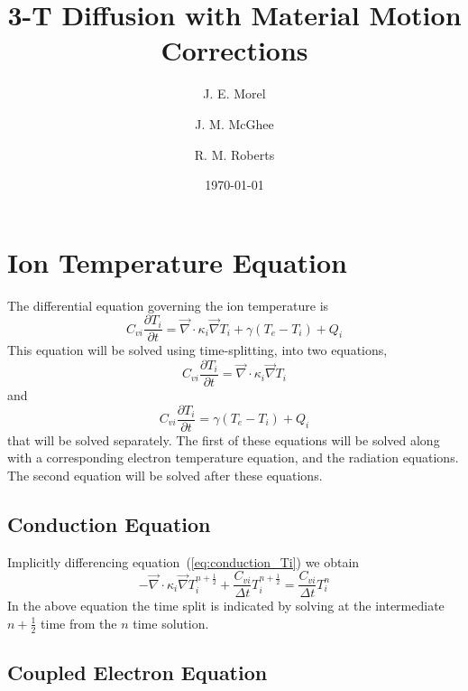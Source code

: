 \documentclass{article}
\newcommand{\partl}[2]{\ensuremath{\frac{\partial{#1}}{\partial{#2}}}}\newcommand{\del}{\ensuremath{\vec{\nabla}}}
\begin{document}
\title{3-T Diffusion with Material Motion Corrections}
\author{J. E. Morel \and J. M. McGhee \and R. M. Roberts}
\date{\today}

\maketitle

\newpage

\section{Ion Temperature Equation}

The differential equation governing the ion temperature is
\begin{equation}
        C_{vi} \partl{T_{i}}{t} = \del \cdot \kappa_{i} \del T_{i}
                                        + \gamma (T_{e}-T_{i}) + Q_{i}
\end{equation}
This equation will be solved using time-splitting, into two equations,
\begin{equation}
        C_{vi} \partl{T_{i}}{t} = \del \cdot \kappa_{i} \del T_{i}
\label{eq:conduction_Ti}
\end{equation}
and
\begin{equation}
        C_{vi} \partl{T_{i}}{t} = \gamma (T_{e}-T_{i}) + Q_{i}
\label{eq:couple_Ti}
\end{equation}
that will be solved separately.
The first of these equations will be solved along with a corresponding
electron temperature equation, and the radiation equations.
The second equation will be solved after these equations.

\subsection{Conduction Equation}

Implicitly differencing equation~(\ref{eq:conduction_Ti})
we obtain
\begin{equation}
  \boxed{
     - \del \cdot \kappa_{i} \del T_{i}^{n+\frac{1}{2}}
     + \frac{C_{vi}}{\Delta t} T_{i}^{n+\frac{1}{2}}
           = \frac{C_{vi}}{\Delta t} T_{i}^{n}
  }
\label{eq:conduction_Ti_tdiff}  
\end{equation}
In the above equation the time split is indicated by solving at the
intermediate $n+\frac{1}{2}$ time from the $n$ time solution.

\subsection{Coupled Electron Equation}
\end{document}

